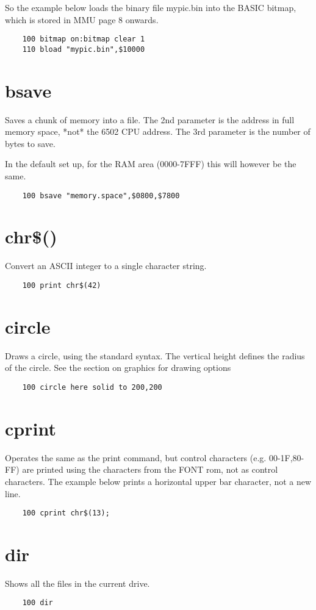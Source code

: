 So the example below loads the binary file mypic.bin into the BASIC bitmap, which is stored in MMU page 8 onwards.
\example{}
\begin{verbatim}
	100 bitmap on:bitmap clear 1
	110 bload "mypic.bin",$10000
\end{verbatim}

\section*{bsave}
Saves a chunk of memory into a file. The 2nd parameter is the address in full memory space, *not* the 6502 CPU address. The 3rd parameter is the number of bytes to save.

In the default set up, for the RAM area (0000-7FFF) this will however be the same.

\example{}
\begin{verbatim}
	100 bsave "memory.space",$0800,$7800
\end{verbatim}

\section*{chr\$()}
Convert an ASCII integer to a single character string.
\example{}
\begin{verbatim}
	100 print chr$(42)
\end{verbatim}

\section*{circle}
Draws a circle, using the standard syntax. The vertical height defines the radius of the circle. See the section on graphics for drawing options
\example{}
\begin{verbatim}
	100 circle here solid to 200,200
\end{verbatim}

\section*{cprint}
Operates the same as the print command, but control characters (e.g. 00-1F,80-FF) are printed using the characters from the FONT rom, not as control characters. The example below prints a horizontal upper bar character, not a new line.
\example{}
\begin{verbatim}
	100 cprint chr$(13);
\end{verbatim}

\section*{dir}
Shows all the files in the current drive.
\example{}
\begin{verbatim}
	100 dir
\end{verbatim}


